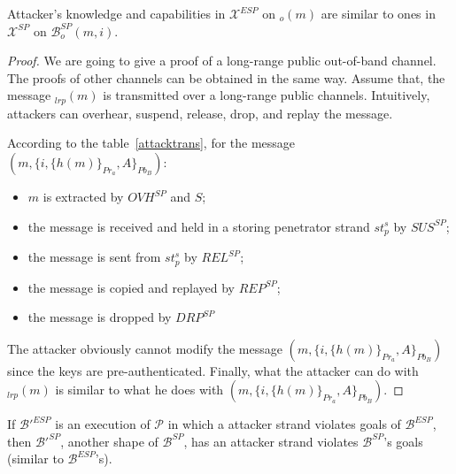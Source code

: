\begin{Lemma}\label{sameattack}
Attacker's knowledge and capabilities in $\mathcal{X}^{ESP}$ on $_o(m)$ are similar to ones in $\mathcal{X}^{SP}$ on $\mathcal{B}^{SP}_o(m,i)$. 
\end{Lemma}
\begin{proof}
We are going to give a proof of a long-range public out-of-band channel. The proofs of other channels can be obtained in the same way. Assume that, the message $_{lrp}(m)$ is transmitted over a long-range public channels. Intuitively, attackers can overhear, suspend, release, drop, and replay the message. 

According to the table~\ref{attacktrans}, for the message $(m, \{i,\{h(m)\}_{Pr_a},A\}_{Pb_B})$:
\begin{itemize}
\item $m$ is extracted by $OVH^{SP}$ and $S$;
\item the message is received and held in a storing penetrator strand $st^s_p$ by $SUS^{SP}$;
\item the message is sent from $st^s_p$ by $REL^{SP}$;
\item the message is copied and replayed by $REP^{SP}$;
\item the message is dropped by $DRP^{SP}$
\end{itemize}

The attacker obviously cannot modify the message $(m, \{i,\{h(m)\}_{Pr_a},A\}_{Pb_B})$ since the keys are pre-authenticated. Finally, what the attacker can do with $_{lrp}(m)$ is similar to what he does with $(m, \{i,\{h(m)\}_{Pr_a},A\}_{Pb_B})$.
\end{proof}

\begin{Lemma}\label{lemma514}
If $\mathcal{B'}^{ESP}$ is an execution of $\mathcal{P}$ in which a attacker strand violates goals of $\mathcal{B}^{ESP}$, then $\mathcal{B'}^{SP}$, another shape of $\mathcal{B}^{SP}$, has an attacker strand violates $\mathcal{B}^{SP}$'s goals (similar to $\mathcal{B}^{ESP}$'s).
\end{Lemma}


